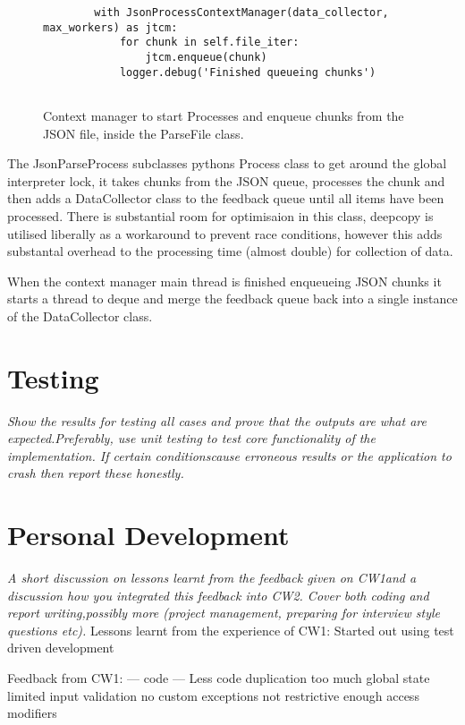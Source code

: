 \documentclass[11pt]{article}
\begin{document}
\begin{figure}[h]
    \begin{verbatim}
        with JsonProcessContextManager(data_collector, max_workers) as jtcm:
            for chunk in self.file_iter:
                jtcm.enqueue(chunk)
            logger.debug('Finished queueing chunks')
        
    \end{verbatim}
    \caption{Context manager to start Processes and enqueue chunks from the JSON file, inside the ParseFile class.}
    \label{fig:JSONPContextManager}
\end{figure}

The JsonParseProcess subclasses pythons Process class to get around the global interpreter lock, it takes chunks from the JSON queue, processes the chunk and then adds a DataCollector class to the feedback queue until all items have been processed. 
There is substantial room for optimisaion in this class, deepcopy is utilised liberally as a workaround to prevent race conditions, however this adds substantal overhead to the processing time (almost double) for collection of data.

When the context manager main thread is finished enqueueing JSON chunks it starts a thread to deque and merge the feedback queue back into a single instance of the DataCollector class.

\section{Testing}
\emph{Show  the  results  for  testing  all  cases  and  prove  that  the  outputs  are  what  are  expected.Preferably,  use  unit  testing  to  test  core  functionality  of  the  implementation.   If  certain  conditionscause erroneous results or the application to crash then report these honestly.}

\section{Personal Development}
\emph{A short discussion on lessons learnt from the feedback given on CW1and a discussion how you integrated this feedback into CW2.  Cover both coding and report writing,possibly more (project management, preparing for interview style questions etc).}
Lessons learnt from the experience of CW1:
Started out using test driven development


Feedback from CW1:
 --- code ---
Less code duplication
too much global state
limited input validation
no custom exceptions
not restrictive enough access modifiers
\end{document}
